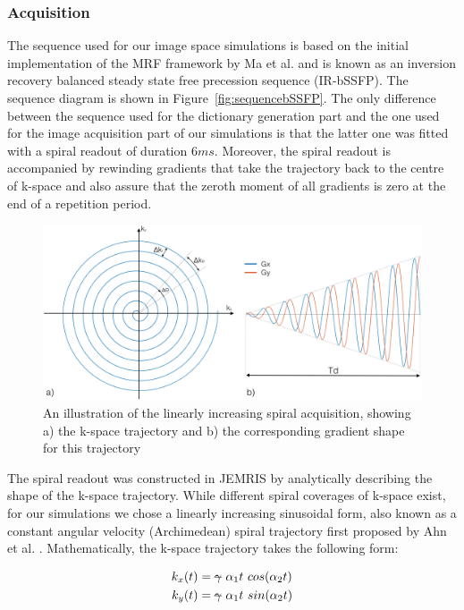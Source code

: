 \subsubsection{Acquisition}

The sequence used for our image space simulations is based on the initial implementation of the MRF framework by Ma et al. \cite{Ma2013} and is known as an inversion recovery balanced steady state free precession sequence (IR-bSSFP).
The sequence diagram is shown in Figure~\ref{fig:sequencebSSFP}.
The only difference between the sequence used for the dictionary generation part and the one used for the image acquisition part of our simulations is that the latter one was fitted with a spiral readout of duration $6 ms$.
Moreover, the spiral readout is accompanied by rewinding gradients that take the trajectory back to the centre of k-space and also assure that the zeroth moment of all gradients is zero at the end of a repetition period.

\begin{figure}[ht]
    \centering
    \includegraphics[angle=0,width=1\textwidth, keepaspectratio]{images/mrf/spiralAcquisition}
    \caption{An illustration of the linearly increasing spiral acquisition, showing a) the k-space trajectory and b) the corresponding gradient shape for this trajectory}
    \label{fig:spiralAcquisition}
\end{figure}

The spiral readout was constructed in JEMRIS by analytically describing the shape of the k-space trajectory.
While different spiral coverages of k-space exist, for our simulations we chose a linearly increasing sinusoidal form, also known as a constant angular velocity (Archimedean) spiral trajectory first proposed by Ahn et al. \cite{Ahn1986}. 
Mathematically, the k-space trajectory takes the following form:

\begin{equation}\label{eq:kspacespiral}
    \begin{split}
        k_x(t) &= \text{\sout{$\gamma$}} \, \, \alpha_1 t \, \, cos (\alpha_2 t) \\
        k_y(t) &= \text{\sout{$\gamma$}}  \, \, \alpha_1 t  \, \, sin (\alpha_2 t) 
    \end{split}
\end{equation}

